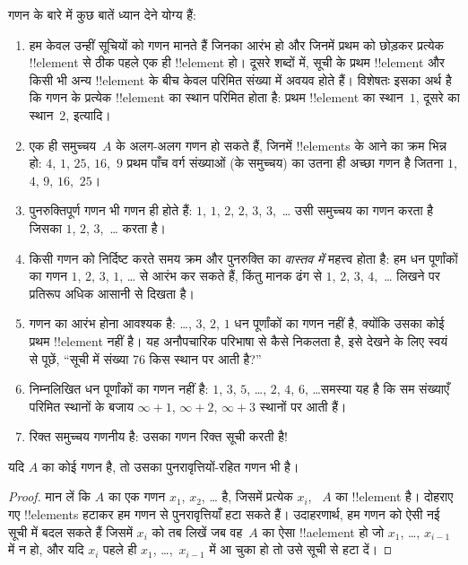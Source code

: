 \documentclass[../../../include/open-logic-section]{subfiles}
\begin{document}
\begin{explain}
गणन के बारे में कुछ बातें ध्यान देने योग्य हैं:
\begin{enumerate}
\item हम केवल उन्हीं सूचियों को गणन मानते हैं जिनका आरंभ हो और जिनमें प्रथम
  को छोड़कर प्रत्येक !!{element} से ठीक पहले एक ही !!{element} हो। दूसरे
  शब्दों में, सूची के प्रथम !!{element} और किसी भी अन्य !!{element}
  के बीच केवल परिमित संख्या में अवयव होते हैं। विशेषतः इसका अर्थ है कि गणन के
  प्रत्येक !!{element} का स्थान परिमित होता है: प्रथम !!{element} का
  स्थान~$1$, दूसरे का स्थान~$2$, इत्यादि।
\item एक ही समुच्चय~$A$ के अलग-अलग गणन हो सकते हैं, जिनमें !!{element}s के आने
  का क्रम भिन्न हो: $4$, $1$, $25$, $16$,~$9$ प्रथम पाँच वर्ग संख्याओं (के
  समुच्चय) का उतना ही अच्छा गणन है जितना $1$, $4$, $9$, $16$,~$25$।
\item पुनरुक्तिपूर्ण गणन भी गणन ही होते हैं: $1$, $1$, $2$, $2$, $3$,
  $3$,~\dots{} उसी समुच्चय का गणन करता है जिसका $1$, $2$, $3$,~\dots{} करता
  है।
\item किसी गणन को निर्दिष्ट करते समय क्रम और पुनरुक्ति का \emph{वास्तव में}
  महत्त्व होता है: हम धन पूर्णांकों का गणन $1$, $2$, $3$, $1$, \dots{} से
  आरंभ कर सकते हैं, किंतु मानक ढंग से $1$, $2$, $3$, $4$,~\dots{} लिखने पर
  प्रतिरूप अधिक आसानी से दिखता है।
\item गणन का आरंभ होना आवश्यक है: \dots, $3$, $2$, $1$ धन पूर्णांकों का गणन
  नहीं है, क्योंकि उसका कोई प्रथम !!{element} नहीं है। यह अनौपचारिक परिभाषा
  से कैसे निकलता है, इसे देखने के लिए स्वयं से पूछें, ``सूची में संख्या 76 किस
  स्थान पर आती है?''
\item निम्नलिखित धन पूर्णांकों का गणन नहीं है: $1$, $3$, $5$, \dots, $2$,
  $4$, $6$, \dots\@ समस्या यह है कि सम संख्याएँ परिमित स्थानों के बजाय
  $\infty + 1$, $\infty + 2$, $\infty +
  3$ स्थानों पर आती हैं।
\item रिक्त समुच्चय गणनीय है: उसका गणन रिक्त सूची करती है!{}
\end{enumerate}
\end{explain}

\begin{prop}
  यदि $A$ का कोई गणन है, तो उसका पुनरावृत्तियों-रहित गणन भी है।
\end{prop}

\begin{proof}
  मान लें कि $A$ का एक गणन $x_1$, $x_2$, \dots{} है, जिसमें प्रत्येक $x_i$,
  ~$A$ का !!{element} है। दोहराए गए !!{element}s हटाकर हम गणन से
  पुनरावृत्तियाँ हटा सकते हैं। उदाहरणार्थ, हम गणन को ऐसी नई सूची में बदल सकते
  हैं जिसमें $x_i$ को तब लिखें जब वह~$A$ का ऐसा !!a{element} हो जो $x_1$,
  \dots, $x_{i-1}$ में न हो, और यदि $x_i$ पहले ही $x_1$,
  \dots,~$x_{i-1}$ में आ चुका हो तो उसे सूची से हटा दें।
\end{proof}
\end{document}
